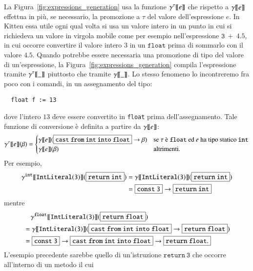 La Figura~\ref{fig:expressions_generation} usa la funzione
${\gamma^{{\tau}}[\![{e}]\!]}$ che rispetto a ${\gamma[\![{e}]\!]}$ effettua in pi\`u,
se necessario, la promozione a $\tau$ del valore dell'espressione $e$.
In Kitten essa \e utile ogni qual volta si usa un valore intero
in un punto in cui si richiedeva un valore in virgola mobile come
per esempio nell'espressione $\mathtt{3\ +\ 4.5}$, in cui occorre convertire
il valore intero $3$ in un $\mathtt{float}$ prima di sommarlo con
il valore $4.5$. Quando potrebbe essere necessaria una promozione di tipo
del valore di un'espressione, la Figura~\ref{fig:expressions_generation}
compila l'espressione tramite ${\gamma^{{\tau}}[\![{\_}]\!]}$ piuttosto
che tramite ${\gamma[\![{\_}]\!]}$.
Lo stesso fenomeno lo incontreremo fra poco con i comandi,
in un assegnamento del tipo:
%
\begin{verbatim}
  float f := 13
\end{verbatim}
%
dove l'intero $13$ deve essere convertito in \texttt{float} prima
dell'assegnamento.
Tale funzione di conversione \`e definita a partire da ${\gamma[\![{e}]\!]}$:
\begin{equation}\label{eq:gentwo}
  {\gamma^{{\tau}}[\![{e}]\!]}(\beta)=\begin{cases}
    {\gamma[\![{e}]\!]}(\fbox{$\mathtt{cast\ from\ int\ into\ float}$}\to\beta) &
      \text{se $\tau$ \`e $\mathtt{float}$ ed
            $e$ ha tipo statico $\mathtt{int}$}\\
    {\gamma[\![{e}]\!]}(\beta) & \text{altrimenti.}
  \end{cases}
\end{equation}
Per esempio,
%
\begin{align*}
  \gentwo{\mathtt{int}}{\mathtt{IntLiteral(3)}}(\fbox{$\mathtt{return\ int}$})
    &=\gen{\mathtt{IntLiteral(3)}}(\fbox{$\mathtt{return\ int}$})\\
  &=\fbox{$\mathtt{const\ 3}$}\to\fbox{$\mathtt{return\ int}$}
\end{align*}
%
mentre
%
\begin{align*}
  &\quad\gentwo{\mathtt{float}}{\mathtt{IntLiteral(3)}}
    (\fbox{$\mathtt{return\ float}$})\\
  &=\gen{\mathtt{IntLiteral(3)}}(\fbox{$\mathtt{cast\ from\ int\ into\ float}$}
    \to\fbox{$\mathtt{return\ float}$})\\
  &=\fbox{$\mathtt{const\ 3}$}\to\fbox{$\mathtt{cast\ from\ int\ into\ float}$}
    \to\fbox{$\mathtt{return\ float}$.}
\end{align*}
%
L'esempio precedente sarebbe quello di un'istruzione
$\mathtt{return\ 3}$ che occorre all'interno di un metodo il cui
